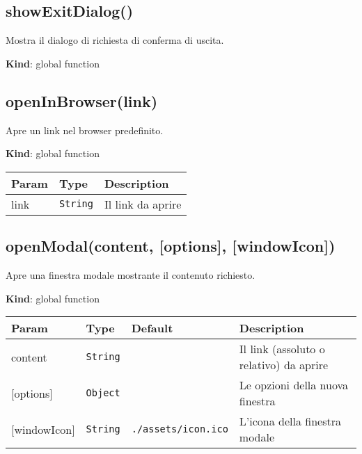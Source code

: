 \protect\hypertarget{showExitDialog}{}{}

\hypertarget{showexitdialog}{%
\subsection{showExitDialog()}\label{showexitdialog}}

Mostra il dialogo di richiesta di conferma di uscita.

\textbf{Kind}: global function\\
\protect\hypertarget{openInBrowser}{}{}

\hypertarget{openinbrowserlink}{%
\subsection{openInBrowser(link)}\label{openinbrowserlink}}

Apre un link nel browser predefinito.

\textbf{Kind}: global function

\begin{longtabu} to \textwidth {X[1,L,m]X[1,L,m]X[1.5,L,m]}
\toprule
Param & Type & Description\tabularnewline
\midrule
\endhead
link & \texttt{String} & Il link da aprire\tabularnewline
\bottomrule
\end{longtabu}

\protect\hypertarget{openModal}{}{}

\hypertarget{openmodalcontent-options-windowicon}{%
\subsection{openModal(content, {[}options{]},
{[}windowIcon{]})}\label{openmodalcontent-options-windowicon}}

Apre una finestra modale mostrante il contenuto richiesto.

\textbf{Kind}: global function

\begin{longtabu} to \textwidth {X[1,L,m]X[1,L,m]X[1.5,L,m]X[1.5,L,m]}
\toprule
Param & Type & Default & Description\tabularnewline
\midrule
\endhead
content & \texttt{String} & & Il link (assoluto o relativo) da
aprire\tabularnewline
{[}options{]} & \texttt{Object} & & Le opzioni della nuova
finestra\tabularnewline
{[}windowIcon{]} & \texttt{String} & \texttt{./assets/icon.ico} &
L'icona della finestra modale\tabularnewline
\bottomrule
\end{longtabu}

\protect\hypertarget{openOnKeyboardShortcut}{}{}

